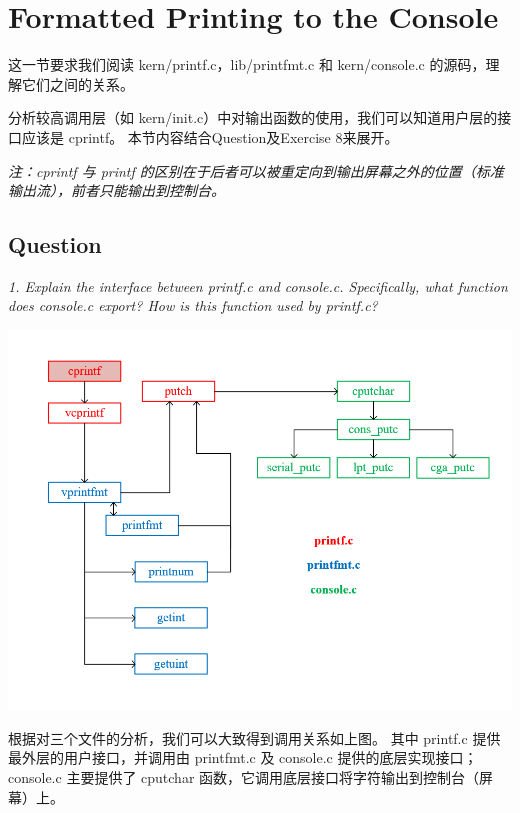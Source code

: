 \documentclass[12pt, letterpaper]{report}
\begin{document}
\section[\large Formatted Printing to the Console]{Formatted Printing to the Console}
这一节要求我们阅读 kern/printf.c，lib/printfmt.c 和 kern/console.c 的源码，理解它们之间的关系。\par 
分析较高调用层（如 kern/init.c）中对输出函数的使用，我们可以知道用户层的接口应该是 cprintf。
本节内容结合Question及Exercise 8来展开。\par
\textsl{注：cprintf 与 printf 的区别在于后者可以被重定向到输出屏幕之外的位置（标准输出流），前者只能输出到控制台。} \par 

\newpage
\subsection{\large Question}
\textsl{1. Explain the interface between printf.c and console.c. 
        Specifically, what function does console.c export? 
        How is this function used by printf.c?} \par
\includegraphics[width=\textwidth]{cprintf_callchain} \par
根据对三个文件的分析，我们可以大致得到调用关系如上图。
其中 printf.c 提供最外层的用户接口，并调用由 printfmt.c 及 console.c 提供的底层实现接口；
console.c 主要提供了 cputchar 函数，它调用底层接口将字符输出到控制台（屏幕）上。 \par 
\quad \par
\end{document}
